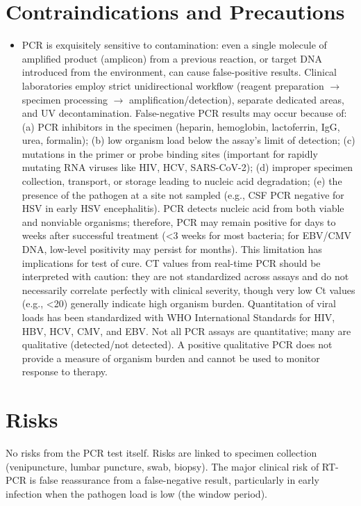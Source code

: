 \section*{Contraindications and Precautions}
\begin{itemize}
  \item PCR is exquisitely sensitive to contamination: even a single molecule of amplified product (amplicon) from a previous reaction, or target DNA introduced from the environment, can cause false-positive results. Clinical laboratories employ strict unidirectional workflow (reagent preparation $\rightarrow$ specimen processing $\rightarrow$ amplification/detection), separate dedicated areas, and UV decontamination. False-negative PCR results may occur because of: (a) PCR inhibitors in the specimen (heparin, hemoglobin, lactoferrin, IgG, urea, formalin); (b) low organism load below the assay's limit of detection; (c) mutations in the primer or probe binding sites (important for rapidly mutating RNA viruses like HIV, HCV, SARS-CoV-2); (d) improper specimen collection, transport, or storage leading to nucleic acid degradation; (e) the presence of the pathogen at a site not sampled (e.g., CSF PCR negative for HSV in early HSV encephalitis). PCR detects nucleic acid from both viable and nonviable organisms; therefore, PCR may remain positive for days to weeks after successful treatment (<3 weeks for most bacteria; for EBV/CMV DNA, low-level positivity may persist for months). This limitation has implications for test of cure. CT values from real-time PCR should be interpreted with caution: they are not standardized across assays and do not necessarily correlate perfectly with clinical severity, though very low Ct values (e.g., <20) generally indicate high organism burden. Quantitation of viral loads has been standardized with WHO International Standards for HIV, HBV, HCV, CMV, and EBV. Not all PCR assays are quantitative; many are qualitative (detected/not detected). A positive qualitative PCR does not provide a measure of organism burden and cannot be used to monitor response to therapy.
\end{itemize}
\section*{Risks}
No risks from the PCR test itself. Risks are linked to specimen collection (venipuncture, lumbar puncture, swab, biopsy). The major clinical risk of RT-PCR is false reassurance from a false-negative result, particularly in early infection when the pathogen load is low (the window period).

